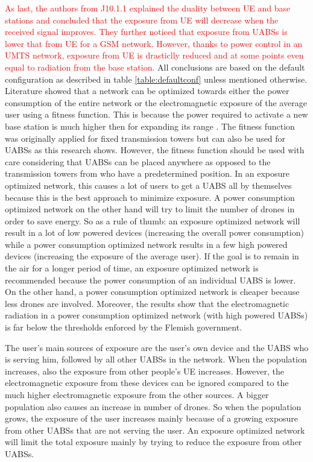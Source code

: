\textcolor{red}{
   As last, the authors from \gls{J10.1.1} explained the duality between \gls{UE} and base stations and concluded that the exposure 
 from \gls{UE} will decrease when the received signal improves. They further noticed that 
 exposure from \gls{UABS}s is lower that from \gls{UE} for a GSM network. However, thanks to power control in an \gls{UMTS} network,
 exposure from \gls{UE} is drasticlly reduced and at some points even equal to radiation from the base station.
}
All conclusions are based on the default configuration as described in table \ref{table:defaultconf} unless mentioned otherwise.
Literature showed that a network can be optimized towards either the power consumption of the entire network 
or the electromagnetic exposure of the average user using a fitness function. This is because the power required to activate a new 
base station is much higher then for expanding its range \cite{J1}.
The fitness function was originally applied for fixed transmission towers but can also be used 
for \gls{UABS}s as this research shows.
However, the fitness function should be used with care considering that \gls{UABS}s can be placed anywhere as opposed to 
the transmission towers from \cite{J1} who have a predetermined position.  
In an exposure optimized network, this causes a lot of users to get a \gls{UABS} all by themselves because this is the best approach to minimize exposure.
A power consumption optimized network on the other hand will try to limit the number of drones 
in order to save energy. So as a rule of thumb: an exposure optimized network will result in a lot of low powered devices (increasing the overall power consumption)
while a power consumption optimized network results in a few high powered devices (increasing the exposure of the average user).
If the goal is to remain in the air for a longer period of time, an exposure optimized network is recommended because the power consumption of 
an individual \gls{UABS} is lower.
On the other hand, a power consumption optimized network is cheaper because less drones are involved.
Moreover, the results show that the electromagnetic radiation in a power consumption optimized network (with high powered \gls{UABS}s)
is far below the thresholds enforced by the Flemish government.

The user's main sources of exposure are the user's own device and the \gls{UABS} who is serving him, followed by all
other \gls{UABS}s in the network. 
When the population increases, also the exposure from other people's \gls{UE} increases. However, the electromagnetic
 exposure from these devices can be ignored compared to the much higher electromagnetic exposure from the other sources. 
A bigger population also causes an increase in number of drones. So when the population grows, the exposure of the 
user increases mainly because of a growing exposure from other \gls{UABS}s that are not serving the user.
An exposure optimized network will limit the total exposure mainly by trying to reduce the exposure from other \gls{UABS}s.

